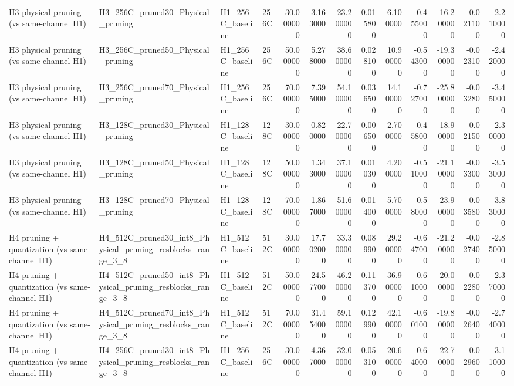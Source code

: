 \begin{table}
\begin{tabular}{llllrrrrrrrrr}
H3 physical pruning (vs same-channel H1) & H3\_256C\_pruned30\_Physical\_pruning & H1\_256C\_baseline & 256C & 30.000000 & 3.163000 & 23.200000 & 0.015800 & 6.100000 & -0.455000 & -16.200000 & -0.021100 & -2.210000 \\
H3 physical pruning (vs same-channel H1) & H3\_256C\_pruned50\_Physical\_pruning & H1\_256C\_baseline & 256C & 50.000000 & 5.278000 & 38.600000 & 0.028100 & 10.900000 & -0.543000 & -19.300000 & -0.023100 & -2.420000 \\
H3 physical pruning (vs same-channel H1) & H3\_256C\_pruned70\_Physical\_pruning & H1\_256C\_baseline & 256C & 70.000000 & 7.395000 & 54.100000 & 0.036500 & 14.100000 & -0.727000 & -25.800000 & -0.032800 & -3.450000 \\
H3 physical pruning (vs same-channel H1) & H3\_128C\_pruned30\_Physical\_pruning & H1\_128C\_baseline & 128C & 30.000000 & 0.820000 & 22.700000 & 0.006500 & 2.700000 & -0.458000 & -18.900000 & -0.021500 & -2.300000 \\
H3 physical pruning (vs same-channel H1) & H3\_128C\_pruned50\_Physical\_pruning & H1\_128C\_baseline & 128C & 50.000000 & 1.343000 & 37.100000 & 0.010300 & 4.200000 & -0.510000 & -21.100000 & -0.033000 & -3.530000 \\
H3 physical pruning (vs same-channel H1) & H3\_128C\_pruned70\_Physical\_pruning & H1\_128C\_baseline & 128C & 70.000000 & 1.867000 & 51.600000 & 0.014000 & 5.700000 & -0.580000 & -23.900000 & -0.035800 & -3.830000 \\
H4 pruning + quantization (vs same-channel H1) & H4\_512C\_pruned30\_int8\_Physical\_pruning\_resblocks\_range\_3\_8 & H1\_512C\_baseline & 512C & 30.000000 & 17.702000 & 33.300000 & 0.089900 & 29.200000 & -0.647000 & -21.200000 & -0.027400 & -2.850000 \\
H4 pruning + quantization (vs same-channel H1) & H4\_512C\_pruned50\_int8\_Physical\_pruning\_resblocks\_range\_3\_8 & H1\_512C\_baseline & 512C & 50.000000 & 24.577000 & 46.200000 & 0.113700 & 36.900000 & -0.610000 & -20.000000 & -0.022800 & -2.370000 \\
H4 pruning + quantization (vs same-channel H1) & H4\_512C\_pruned70\_int8\_Physical\_pruning\_resblocks\_range\_3\_8 & H1\_512C\_baseline & 512C & 70.000000 & 31.454000 & 59.100000 & 0.129900 & 42.100000 & -0.601000 & -19.800000 & -0.026400 & -2.740000 \\
H4 pruning + quantization (vs same-channel H1) & H4\_256C\_pruned30\_int8\_Physical\_pruning\_resblocks\_range\_3\_8 & H1\_256C\_baseline & 256C & 30.000000 & 4.367000 & 32.000000 & 0.053100 & 20.600000 & -0.640000 & -22.700000 & -0.029600 & -3.110000 \\

\end{tabular}
\end{table}
